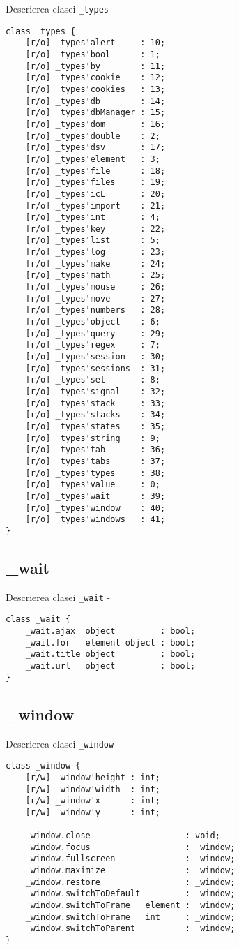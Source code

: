 \noindent Descrierea clasei \texttt{\_types} -
\begin{verbatim}
class _types {
	[r/o] _types'alert     : 10;
	[r/o] _types'bool      : 1;
	[r/o] _types'by        : 11;
	[r/o] _types'cookie    : 12;
	[r/o] _types'cookies   : 13;
	[r/o] _types'db        : 14;
	[r/o] _types'dbManager : 15;
	[r/o] _types'dom       : 16;
	[r/o] _types'double    : 2;
	[r/o] _types'dsv       : 17;
	[r/o] _types'element   : 3;
	[r/o] _types'file      : 18;
	[r/o] _types'files     : 19;
	[r/o] _types'icL       : 20;
	[r/o] _types'import    : 21;
	[r/o] _types'int       : 4;
	[r/o] _types'key       : 22;
	[r/o] _types'list      : 5;
	[r/o] _types'log       : 23;
	[r/o] _types'make      : 24;
	[r/o] _types'math      : 25;
	[r/o] _types'mouse     : 26;
	[r/o] _types'move      : 27;
	[r/o] _types'numbers   : 28;
	[r/o] _types'object    : 6;
	[r/o] _types'query     : 29;
	[r/o] _types'regex     : 7;
	[r/o] _types'session   : 30;
	[r/o] _types'sessions  : 31;
	[r/o] _types'set       : 8;
	[r/o] _types'signal    : 32;
	[r/o] _types'stack     : 33;
	[r/o] _types'stacks    : 34;
	[r/o] _types'states    : 35;
	[r/o] _types'string    : 9;
	[r/o] _types'tab       : 36;
	[r/o] _types'tabs      : 37;
	[r/o] _types'types     : 38;
	[r/o] _types'value     : 0;
	[r/o] _types'wait      : 39;
	[r/o] _types'window    : 40;
	[r/o] _types'windows   : 41;
}
\end{verbatim}

\subsection{{\color{orange} \_wait}}

\noindent Descrierea clasei \texttt{\_wait} -
\begin{verbatim}
class _wait {
	_wait.ajax  object         : bool;
	_wait.for   element object : bool;
	_wait.title object         : bool;
	_wait.url   object         : bool;
}
\end{verbatim}

\subsection{{\color{orange} \_window}}

\noindent Descrierea clasei \texttt{\_window} -
\begin{verbatim}
class _window {
	[r/w] _window'height : int;
	[r/w] _window'width  : int;
	[r/w] _window'x      : int;
	[r/w] _window'y      : int;
	
	_window.close                   : void;
	_window.focus                   : _window;
	_window.fullscreen              : _window;
	_window.maximize                : _window;
	_window.restore                 : _window;
	_window.switchToDefault         : _window;
	_window.switchToFrame   element : _window;
	_window.switchToFrame   int     : _window;
	_window.switchToParent          : _window;
}
\end{verbatim}

